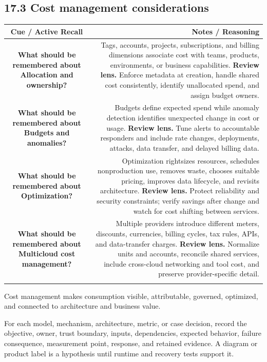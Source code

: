 \documentclass[11pt]{article}
\newcommand{\CornellHeader}{\rowcolor{Navy}\color{white}\bfseries Cue / Active Recall & \color{white}\bfseries Notes / Reasoning \\\endhead}
\newcommand{\CornellRow}[2]{\cellcolor{CueGray}\textbf{#1} & #2 \\\addlinespace[3pt]}
\begin{document}
\subsection{17.3 Cost management considerations}
\begin{longtable}{@{}C N@{}}
\CornellHeader
\CornellRow{What should be remembered about Allocation and ownership?}{Tags, accounts, projects, subscriptions, and billing dimensions associate cost with teams, products, environments, or business capabilities. \textbf{Review lens.} Enforce metadata at creation, handle shared cost consistently, identify unallocated spend, and assign budget owners.}
\CornellRow{What should be remembered about Budgets and anomalies?}{Budgets define expected spend while anomaly detection identifies unexpected change in cost or usage. \textbf{Review lens.} Tune alerts to accountable responders and include rate changes, deployments, attacks, data transfer, and delayed billing data.}
\CornellRow{What should be remembered about Optimization?}{Optimization rightsizes resources, schedules nonproduction use, removes waste, chooses suitable pricing, improves data lifecycle, and revisits architecture. \textbf{Review lens.} Protect reliability and security constraints; verify savings after change and watch for cost shifting between services.}
\CornellRow{What should be remembered about Multicloud cost management?}{Multiple providers introduce different meters, discounts, currencies, billing cycles, tax rules, APIs, and data-transfer charges. \textbf{Review lens.} Normalize units and accounts, reconcile shared services, include cross-cloud networking and tool cost, and preserve provider-specific detail.}
\end{longtable}
\begin{sectionsummarybox}
Cost management makes consumption visible, attributable, governed, optimized, and connected to architecture and business value.
\end{sectionsummarybox}
\begin{practicebox}
For each model, mechanism, architecture, metric, or case decision, record the objective, owner, trust boundary, inputs, dependencies, expected behavior, failure consequence, measurement point, response, and retained evidence. A diagram or product label is a hypothesis until runtime and recovery tests support it.
\end{practicebox}
\end{document}
